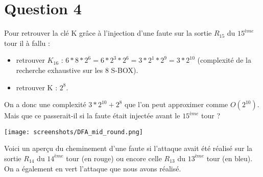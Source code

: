 \documentclass[a4paper,11pt]{article}
\begin{document}
	\section{Question 4}
	Pour retrouver la clé K grâce à l'injection d'une faute sur la sortie $R_{15}$ du $15^{ème}$ tour il à fallu :
	\begin{itemize}
		\item  retrouver $K_{16}$ :  $6 * 8 * 2^{6} = 6 * 2^{3} * 2^{6} = 3 * 2^{1} * 2^{9} = 3 * 2^{10} $ (complexité de la recherche exhaustive sur les 8 S-BOX).
		\item retrouver K : $2^{8}$.
	\end{itemize}
	On a donc une complexité $3 * 2^{10} + 2^{8}$ que l'on peut approximer comme $O(2^{10})$.
	Mais que ce passerait-il si la faute était injectée avant le $15^{ème}$ tour ?
	\begin{center}\texttt{[image: screenshots/DFA\_mid\_round.png]}\end{center}
	Voici un aperçu du cheminement d'une faute si l'attaque avait été réalisé sur la sortie $R_{14}$ du $14^{ème}$ tour (en rouge) ou encore celle $R_{13}$ du $13^{ème}$ tour (en bleu).\\
	On a également en vert l'attaque que nous avons réalisé.\\
\end{document}
